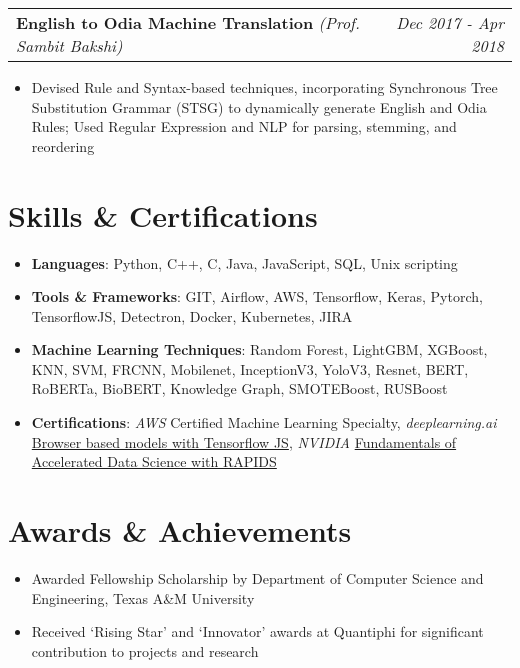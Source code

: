 \documentclass[letterpaper,10.8pt]{article}
\makeatletter
\newcommand{\resumeItem}[2]{
  \item\small{
    \textbf{#1}{#2 \vspace{-6pt}}
  }
}
\newcommand{\resumeSubheadingProjects}[2]{
  \vspace{-1pt}\item
  \hspace{5pt}
    \begin{tabular*}{0.97\textwidth}{l@{\extracolsep{\fill}}r}
      #1 & \textit{\small #2} \\
    \end{tabular*}\vspace{-5pt}
}
\newcommand{\resumeSubHeadingListStart}{}
\newcommand{\resumeSubHeadingListEnd}{}
\newcommand{\resumeItemListStart}{\begin{itemize}}
\newcommand{\resumeItemListEnd}{\end{itemize}\vspace{1pt}}
\makeatother
\begin{document}
     \resumeSubheadingProjects{\textbf{English to Odia Machine Translation }{\small\textit{(Prof. Sambit Bakshi)}}}{Dec 2017 - Apr 2018}
      \resumeItemListStart
      \resumeItem{}{Devised Rule and Syntax-based techniques, incorporating Synchronous Tree Substitution Grammar (STSG) to dynamically generate English and Odia Rules; Used Regular Expression and NLP for parsing, stemming, and reordering}
      \resumeItemListEnd
      
\section{Skills \& Certifications}
\resumeSubHeadingListStart
\resumeItemListStart
	\resumeItem{\textbf{Languages}}{: Python, C++, C, Java, JavaScript, SQL, Unix scripting}
	\resumeItem{\textbf{Tools \& Frameworks}}{: GIT, Airflow, AWS, Tensorflow, Keras, Pytorch, TensorflowJS, Detectron, Docker, Kubernetes, JIRA}
	\resumeItem{\textbf{Machine Learning Techniques}}{: Random Forest, LightGBM, XGBoost, KNN, SVM, FRCNN, Mobilenet, InceptionV3, YoloV3, Resnet, BERT, RoBERTa, BioBERT, Knowledge Graph, SMOTEBoost, RUSBoost}
	\resumeItem{\textbf{Certifications}}{: \textit{AWS} Certified Machine Learning Specialty, \textit{deeplearning.ai} \href{https://www.coursera.org/account/accomplishments/certificate/VVSAJTPDFRM9}{Browser based models with Tensorflow JS}, \textit{NVIDIA} \href{https://courses.nvidia.com/certificates/ded3ffb4eb2647c5ad2e591da9f5b1a4/}{Fundamentals of Accelerated Data Science with RAPIDS}}
\resumeItemListEnd
\resumeSubHeadingListEnd

\section{Awards \& Achievements}
\resumeSubHeadingListStart
\resumeItemListStart
\resumeItem{}{Awarded Fellowship Scholarship by Department of Computer Science and Engineering, Texas A\&M University}
\resumeItem{}{Received ‘Rising Star’ and ‘Innovator’ awards at Quantiphi for significant contribution to projects and research}
\resumeItemListEnd
\resumeSubHeadingListEnd

\end{document}
